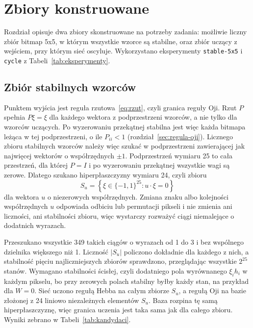 \section{Zbiory konstruowane}
\label{sec:zbiory-konstruowane}

Rozdział opisuje dwa zbiory skonstruowane na potrzeby zadania: możliwie liczny zbiór bitmap \mbox{5x5}, w którym wszystkie wzorce są stabilne, oraz zbiór uczący z wejściem, przy którym sieć oscyluje. Wykorzystano eksperymenty \texttt{stable-5x5} i \texttt{cycle} z Tabeli~\ref{tab:eksperymenty}.

\subsection{Zbiór stabilnych wzorców}
\label{sec:zbiory-stabilne}

Punktem wyjścia jest reguła rzutowa~\eqref{eq:rzut}, czyli granica reguły Oji. Rzut $P$ spełnia $P \xi = \xi$ dla każdego wektora z podprzestrzeni wzorców, a nie tylko dla wzorców uczących. Po wyzerowaniu przekątnej stabilna jest więc każda bitmapa leżąca w tej podprzestrzeni, o ile $P_{ii} < 1$ (rozdział~\ref{sec:regula-oji}). Licznego zbioru stabilnych wzorców należy więc szukać w podprzestrzeni zawierającej jak najwięcej wektorów o współrzędnych $\pm 1$. Podprzestrzeń wymiaru 25 to cała przestrzeń, dla której $P = I$ i po wyzerowaniu przekątnej wszystkie wagi są zerowe. Dlatego szukano hiperpłaszczyzny wymiaru 24, czyli zbioru
\begin{equation}
    S_u = \left\{\xi \in \{-1, 1\}^{25} : u \cdot \xi = 0\right\}
    \label{eq:hiperplaszczyzna}
\end{equation}
dla wektora $u$ o niezerowych współrzędnych. Zmiana znaku albo kolejności współrzędnych $u$ odpowiada odbiciu lub permutacji pikseli i nie zmienia ani liczności, ani stabilności zbioru, więc wystarczy rozważyć ciągi niemalejące o dodatnich wyrazach.

Przeszukano wszystkie 349 takich ciągów o wyrazach od 1 do 3 i bez wspólnego dzielnika większego niż 1. Liczność $\lvert S_u \rvert$ policzono dokładnie dla każdego z nich, a stabilność pięciu najliczniejszych zbiorów sprawdzono, przeglądając wszystkie $2^{25}$ stanów. Wymagano stabilności ścisłej, czyli dodatniego pola wyrównanego $\xi_i h_i$ w każdym pikselu, bo przy zerowych polach stabilny byłby każdy stan, na przykład dla $W = 0$. Sieć uczono regułą Hebba na całym zbiorze $S_u$, a regułą Oji na bazie złożonej z 24 liniowo niezależnych elementów $S_u$. Baza rozpina tę samą hiperpłaszczyznę, więc granica uczenia jest taka sama jak dla całego zbioru. Wyniki zebrano w Tabeli~\ref{tab:kandydaci}.

